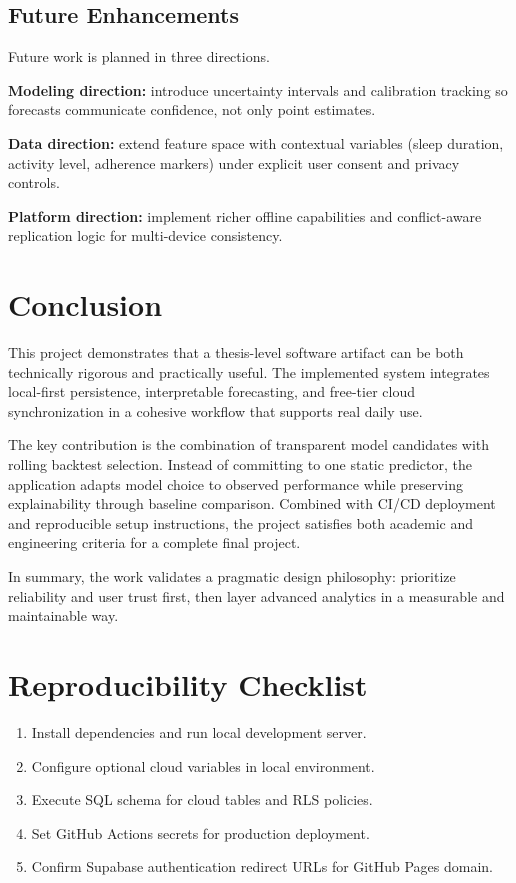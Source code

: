 \documentclass[12pt,a4paper]{report}
\begin{document}
\section{Future Enhancements}
Future work is planned in three directions.

\textbf{Modeling direction:} introduce uncertainty intervals and calibration tracking so forecasts communicate confidence, not only point estimates.

\textbf{Data direction:} extend feature space with contextual variables (sleep duration, activity level, adherence markers) under explicit user consent and privacy controls.

\textbf{Platform direction:} implement richer offline capabilities and conflict-aware replication logic for multi-device consistency.

\chapter{Conclusion}
This project demonstrates that a thesis-level software artifact can be both technically rigorous and practically useful. The implemented system integrates local-first persistence, interpretable forecasting, and free-tier cloud synchronization in a cohesive workflow that supports real daily use.

The key contribution is the combination of transparent model candidates with rolling backtest selection. Instead of committing to one static predictor, the application adapts model choice to observed performance while preserving explainability through baseline comparison. Combined with CI/CD deployment and reproducible setup instructions, the project satisfies both academic and engineering criteria for a complete final project.

In summary, the work validates a pragmatic design philosophy: prioritize reliability and user trust first, then layer advanced analytics in a measurable and maintainable way.

\appendix
\chapter{Reproducibility Checklist}
\begin{enumerate}[label=\arabic*.]
  \item Install dependencies and run local development server.
  \item Configure optional cloud variables in local environment.
  \item Execute SQL schema for cloud tables and RLS policies.
  \item Set GitHub Actions secrets for production deployment.
  \item Confirm Supabase authentication redirect URLs for GitHub Pages domain.
\end{enumerate}
\end{document}
